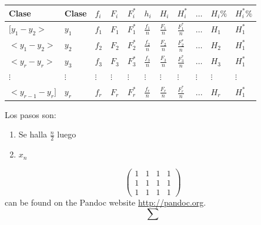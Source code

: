 \documentclass[
  10pt,
]{krantz}
\providecommand{\tightlist}{%
  \setlength{\itemsep}{0pt}\setlength{\parskip}{0pt}}
\theoremstyle{definition}
\theoremstyle{definition}
\theoremstyle{definition}
\theoremstyle{definition}
\theoremstyle{remark}
\begin{document}
\begin{longtable}[]{@{}
  >{\centering\arraybackslash}p{}
  >{\centering\arraybackslash}p{}
  >{\centering\arraybackslash}p{}
  >{\centering\arraybackslash}p{}
  >{\centering\arraybackslash}p{}
  >{\centering\arraybackslash}p{}
  >{\centering\arraybackslash}p{}
  >{\centering\arraybackslash}p{}
  >{\centering\arraybackslash}p{}
  >{\raggedright\arraybackslash}p{}
  >{\raggedright\arraybackslash}p{}@{}}
\toprule
Clase & Clase & \(f_i\) & \(F_i\) & \(F_i^*\) & \(h_i\) & \(H_i\) & \(H_i^*\) & \(\ldots\) & \(H_i\%\) & \(H_i^*\%\) \\
\midrule
\endhead
\([y_1-y_2>\) & \(y_1\) & \(f_1\) & \(F_1\) & \(F_1^*\) & \(\frac{f_1}{n}\) & \(\frac{F_1}{n}\) & \(\frac{F_1^*}{n}\) & \(\ldots\) & \(H_1\) & \(H_1^*\) \\
\(<y_1-y_2>\) & \(y_2\) & \(f_2\) & \(F_2\) & \(F_2^*\) & \(\frac{f_2}{n}\) & \(\frac{F_2}{n}\) & \(\frac{F_2^*}{n}\) & \(\ldots\) & \(H_2\) & \(H_1^*\) \\
\(<y_{r}-y_r>\) & \(y_3\) & \(f_3\) & \(F_3\) & \(F_3^*\) & \(\frac{f_3}{n}\) & \(\frac{F_3}{n}\) & \(\frac{F_3^*}{n}\) & \(\ldots\) & \(H_3\) & \(H_1^*\) \\
\(\vdots\) & \(\vdots\) & \(\vdots\) & \(\vdots\) & \(\vdots\) & \(\vdots\) & \(\vdots\) & \(\vdots\) & \(\vdots\) & \(\vdots\) & \(\vdots\) \\
\(<y_{r-1}-y_r]\) & \(y_r\) & \(f_r\) & \(F_r\) & \(F_r^*\) & \(\frac{f_r}{n}\) & \(\frac{F_r}{n}\) & \(\frac{F_r^*}{n}\) & \(...\) & \(H_r\) & \(H_1^*\) \\
\bottomrule
\end{longtable}

Los pasos son:

\begin{enumerate}
\def\labelenumi{\arabic{enumi}.}
\tightlist
\item
  Se halla \(\frac{n}{2}\) luego
\item
  \(x_n\)
\end{enumerate}

\[ \begin{pmatrix}
1&1&1&1\\
1&1&1&1\\
1&1&1&1
\end{pmatrix}\]
can be found on the Pandoc website \url{http://pandoc.org}.
\[\sum\]
\end{document}
